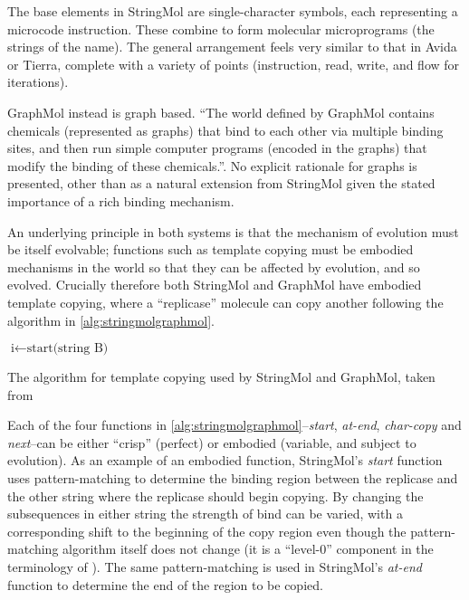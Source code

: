 The base elements in StringMol are single-character symbols, each representing a microcode instruction. These combine to form molecular microprograms (the strings of the name). The general arrangement feels very similar to that in Avida or Tierra, complete with a variety of points (instruction, read, write, and flow for iterations).

GraphMol instead is graph based. ``The world defined by GraphMol contains chemicals (represented as graphs) that bind to each other via multiple binding sites, and then run simple computer programs (encoded in the graphs) that modify the binding of these chemicals.''. No explicit rationale for graphs is presented, other than as a natural extension from StringMol given the stated importance of a rich binding mechanism. 

An underlying principle in both systems is that the mechanism of evolution must be itself evolvable; functions such as template copying must be embodied mechanisms in the world so that they can be affected by evolution, and so evolved.  Crucially therefore both StringMol and GraphMol have embodied template copying, where a ``replicase'' molecule can copy another following the algorithm in \cref{alg:stringmolgraphmol}.

\begin{algorithm}[ht]
$\text{i} \leftarrow \text{start(string B)}$\;
\caption[The algorithm for template copying used by StringMol and GraphMol]{The algorithm for template copying used by StringMol and GraphMol, taken from \textcite{Nellis2014}}
\label{alg:stringmolgraphmol}
\end{algorithm}

Each of the four functions in \cref{alg:stringmolgraphmol}--\emph{start}, \emph{at-end}, \emph{char-copy} and \emph{next}--can be either ``crisp'' (\ie perfect) or embodied (variable, and subject to evolution). As an example of an embodied function, StringMol's \emph{start} function uses pattern-matching to determine the binding region between the replicase and the other string where the replicase should begin copying. By changing the subsequences in either string the strength of bind can be varied, with a corresponding shift to the beginning of the copy region even though the pattern-matching algorithm itself does not change (it is a ``level-0'' component in the terminology of \textcite{BanzhafBaumgaertnerBeslonEtAl2016}). The same pattern-matching is used in StringMol's \emph{at-end} function to determine the end of the region to be copied.

